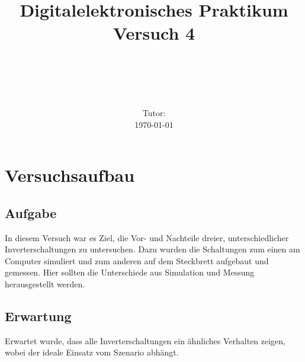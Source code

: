 \documentclass[11pt, a4paper]{article}
\title{\textbf{Digitalelektronisches Praktikum\\ Versuch 4}}
\author{\ATutantName \\ \emph{\ATutantEmail} \and \BTutantName\\ \emph{\BTutantEmail}}
\date{\Gruppennummer \\[3ex] Tutor: \Tutorname \\[3ex] \today}
\begin{document}
\clearpage
\maketitle
\thispagestyle{empty}
\newpage


\section*{Versuchsaufbau}
\subsection*{Aufgabe}
In diesem Versuch war es Ziel, die Vor- und Nachteile dreier, unterschiedlicher Inverterschaltungen zu untersuchen. Dazu wurden die Schaltungen zum einen am Computer simuliert und zum anderen auf dem Steckbrett aufgebaut und gemessen. Hier sollten die Unterschiede aus Simulation und Messung herausgestellt werden.
\subsection*{Erwartung}
Erwartet wurde, dass alle Inverterschaltungen ein ähnliches Verhalten zeigen, wobei der ideale Einsatz vom Szenario abhängt.
\end{document}
